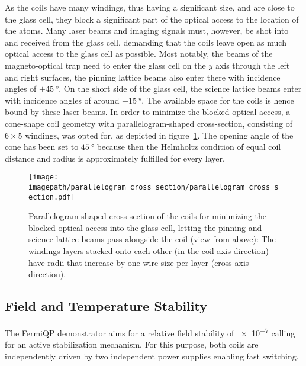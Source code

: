 As the coils have many windings, thus having a significant size, and are close to the glass cell, they block a significant part of the optical access to the location of the atoms. Many laser beams and imaging signals must, however, be shot into and received from the glass cell, demanding that the coils leave open as much optical access to the glass cell as possible. Most notably, the beams of the magneto-optical trap need to enter the glass cell on the $y$ axis through the left and right surfaces, the pinning lattice beams also enter there with incidence angles of $\pm \SI{45}{\degree}$. On the short side of the glass cell, the science lattice beams enter with incidence angles of around $\pm \SI{15}{\degree}$. The available space for the coils is hence bound by these laser beams. In order to minimize the blocked optical access, a cone-shape coil geometry with parallelogram-shaped cross-section, consisting of $6 \times 5$ windings, was opted for, as depicted in figure~\ref{fig:parallelogram_cross_section}. The opening angle of the cone has been set to $\SI{45}{\degree}$ because then the Helmholtz condition of equal coil distance and radius is approximately fulfilled for every layer.
\begin{figure}
    \centering
    \texttt{[image: \\imagepath/parallelogram\_cross\_section/parallelogram\_cross\_section.pdf]}
    \caption{Parallelogram-shaped cross-section of the coils for minimizing the blocked optical access into the glass cell, letting the pinning and science lattice beams pass alongside the coil (view from above): The windings layers stacked onto each other (in the coil axis direction) have radii that increase by one wire size per layer (cross-axis direction).}
    \label{fig:parallelogram_cross_section}
\end{figure}

\subsection*{Field and Temperature Stability}
The FermiQP demonstrator aims for a relative field stability of \SI{e-7}{} calling for an active stabilization mechanism. For this purpose, both coils are independently driven by two independent power supplies enabling fast switching.

